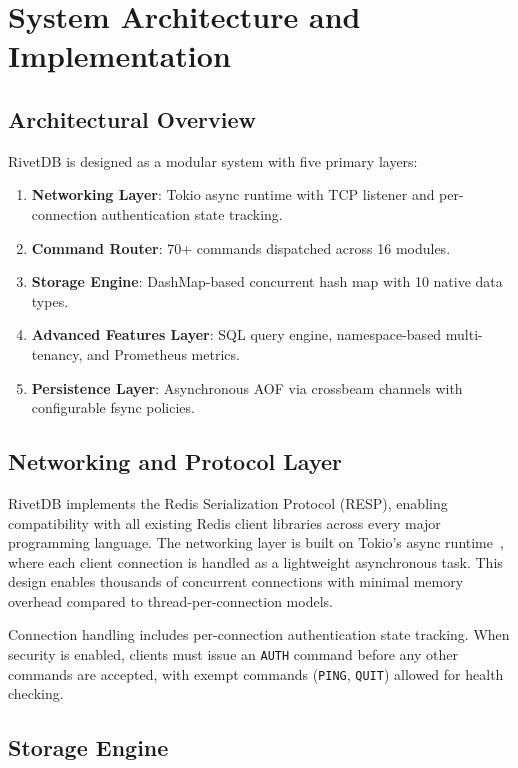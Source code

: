 \documentclass[conference,a4paper]{IEEEtran}
\begin{document}
\section{System Architecture and Implementation}

\subsection{Architectural Overview}

RivetDB is designed as a modular system with five primary layers:

\begin{enumerate}
    \item \textbf{Networking Layer}: Tokio async runtime with TCP listener and per-connection authentication state tracking.
    \item \textbf{Command Router}: 70+ commands dispatched across 16 modules.
    \item \textbf{Storage Engine}: DashMap-based concurrent hash map with 10 native data types.
    \item \textbf{Advanced Features Layer}: SQL query engine, namespace-based multi-tenancy, and Prometheus metrics.
    \item \textbf{Persistence Layer}: Asynchronous AOF via crossbeam channels with configurable fsync policies.
\end{enumerate}

\subsection{Networking and Protocol Layer}

RivetDB implements the Redis Serialization Protocol (RESP), enabling compatibility with all existing Redis client libraries across every major programming language. The networking layer is built on Tokio's async runtime~\cite{yadav2024}, where each client connection is handled as a lightweight asynchronous task. This design enables thousands of concurrent connections with minimal memory overhead compared to thread-per-connection models.

Connection handling includes per-connection authentication state tracking. When security is enabled, clients must issue an \texttt{AUTH} command before any other commands are accepted, with exempt commands (\texttt{PING}, \texttt{QUIT}) allowed for health checking.

\subsection{Storage Engine}
\end{document}
